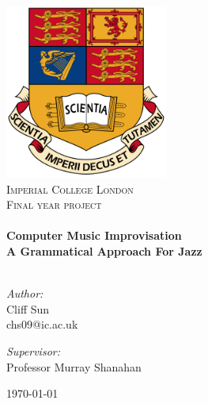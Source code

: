 \begin{titlepage}
\begin{center}

\includegraphics[width=0.4\textwidth]{figure/crest.png}~\\[1cm]

\textsc{\LARGE Imperial College London}\\[1.5cm]

\textsc{\Large Final year project}\\[0.5cm]

\HRule \\[0.4cm]
{ \huge \bfseries Computer Music Improvisation \\
A Grammatical Approach For Jazz}\\[0.4cm]

\HRule \\[1.5cm]

\begin{minipage}{0.4\textwidth}
\begin{flushleft} \large
\emph{Author:}\\
Cliff Sun \\
chs09@ic.ac.uk
\end{flushleft}
\end{minipage}
\begin{minipage}{0.4\textwidth}
\begin{flushright} \large
\emph{Supervisor:} \\
Professor Murray 
Shanahan
\end{flushright}
\end{minipage}

\vfill

{\large \today}

\end{center}
\end{titlepage}